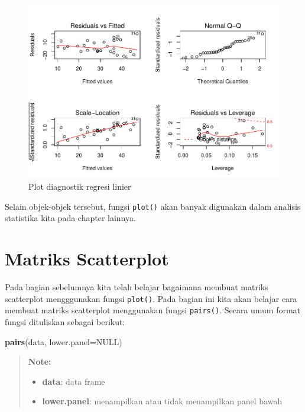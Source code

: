 \documentclass[]{book}
\newenvironment{Shaded}{\begin{snugshade}}{\end{snugshade}}
\newcommand{\KeywordTok}[1]{\textcolor[rgb]{0.13,0.29,0.53}{\textbf{#1}}}
\newcommand{\DataTypeTok}[1]{\textcolor[rgb]{0.13,0.29,0.53}{#1}}
\newcommand{\OtherTok}[1]{\textcolor[rgb]{0.56,0.35,0.01}{#1}}
\newcommand{\NormalTok}[1]{#1}
\providecommand{\tightlist}{%
  \setlength{\itemsep}{0pt}\setlength{\parskip}{0pt}}
\begin{document}
\begin{figure}

{\centering \includegraphics[width=0.8\linewidth]{EnvStat_files/figure-latex/diag-1} 

}

\caption{Plot diagnostik regresi linier}\label{fig:diag}
\end{figure}

Selain objek-objek tersebut, fungsi \texttt{plot()} akan banyak
digunakan dalam analisis statistika kita pada chapter lainnya.

\section{Matriks Scatterplot}\label{matriks-scatterplot}

Pada bagian sebelumnya kita telah belajar bagaimana membuat matriks
scatterplot mengggunakan fungsi \texttt{plot()}. Pada bagian ini kita
akan belajar cara membuat matriks scatterplot menggunakan fungsi
\texttt{pairs()}. Secara umum format fungsi dituliskan sebagai berikut:

\begin{Shaded}
\begin{Highlighting}[]
\KeywordTok{pairs}\NormalTok{(data, }\DataTypeTok{lower.panel=}\OtherTok{NULL}\NormalTok{)}
\end{Highlighting}
\end{Shaded}

\begin{quote}
\textbf{Note: }

\begin{itemize}
\tightlist
\item
  \textbf{data}: data frame
\item
  \textbf{lower.panel}: menampilkan atau tidak menampilkan panel bawah
\end{itemize}
\end{quote}
\end{document}
